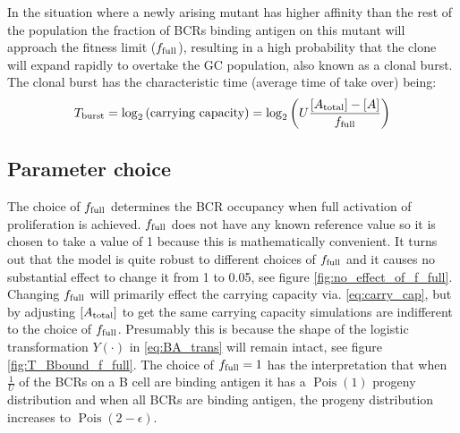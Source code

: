 In the situation where a newly arising mutant has higher affinity than the rest of the population the fraction of BCRs binding antigen on this mutant will approach the fitness limit ($f_{\text{full}}$), resulting in a high probability that the clone will expand rapidly to overtake the GC population, also known as a clonal burst.
The clonal burst has the characteristic time (average time of take over) being:
$$
T_{\text{burst}} = \log_2 \left(\text{carrying capacity} \right) = \log_2\left( U \frac{[A_{\text{total}}] - [A]}{f_{\text{full}}} \right)
$$






\subsection{Parameter choice}
The choice of $f_{\text{full}}$ determines the BCR occupancy when full activation of proliferation is achieved.
$f_{\text{full}}$ does not have any known reference value so it is chosen to take a value of 1 because this is mathematically convenient.
It turns out that the model is quite robust to different choices of $f_{\text{full}}$ and it causes no substantial effect to change it from 1 to 0.05, see figure \ref{fig:no_effect_of_f_full}.
Changing $f_{\text{full}}$ will primarily effect the carrying capacity via. \eqref{eq:carry_cap}, but by adjusting $[A_{\text{total}}]$ to get the same carrying capacity simulations are indifferent to the choice of $f_{\text{full}}$.
Presumably this is because the shape of the logistic transformation $Y(\cdot)$ in \eqref{eq:BA_trans} will remain intact, see figure \ref{fig:T_Bbound_f_full}.
The choice of $f_{\text{full}} = 1$ has the interpretation that when $\frac{1}{U}$ of the BCRs on a B cell are binding antigen it has a $\operatorname{Pois}(1)$ progeny distribution and when all BCRs are binding antigen, the progeny distribution increases to $\operatorname{Pois}(2-\epsilon)$.

